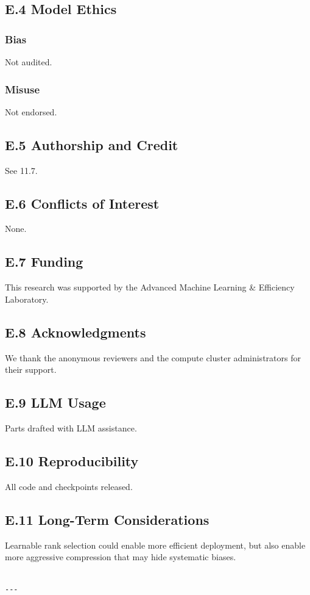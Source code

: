 \subsection{E.4 Model Ethics}

\subsubsection{Bias}
Not audited.

\subsubsection{Misuse}
Not endorsed.

\subsection{E.5 Authorship and Credit}
See  11.7.

\subsection{E.6 Conflicts of Interest}
None.

\subsection{E.7 Funding}
This research was supported by the Advanced Machine Learning & Efficiency Laboratory.

\subsection{E.8 Acknowledgments}
We thank the anonymous reviewers and the compute cluster administrators for their support.

\subsection{E.9 LLM Usage}
Parts drafted with LLM assistance.

\subsection{E.10 Reproducibility}
All code and checkpoints released.

\subsection{E.11 Long-Term Considerations}
Learnable rank selection could enable more efficient deployment, but also 
enable more aggressive compression that may hide systematic biases.
\begin{lstlisting}

---
\end{lstlisting}